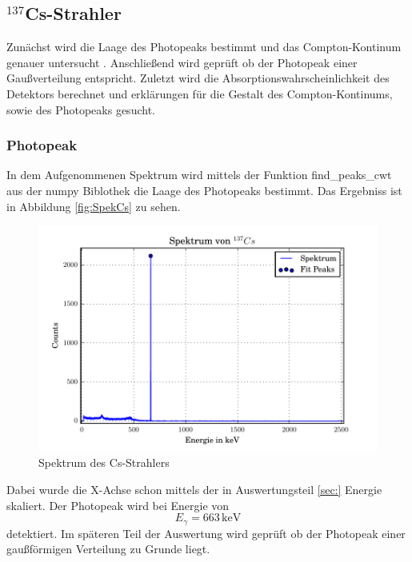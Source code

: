 \subsection{$^{137}$Cs-Strahler}
Zunächst wird die Laage des Photopeaks bestimmt und das Compton-Kontinum genauer untersucht . Anschließend wird geprüft ob der Photopeak einer Gaußverteilung entspricht. Zuletzt wird die Absorptionswahrscheinlichkeit des Detektors berechnet und erklärungen für die Gestalt des Compton-Kontinums, sowie des Photopeaks gesucht.
\subsubsection{Photopeak}
In dem Aufgenommenen Spektrum wird mittels der Funktion find\_peaks\_cwt aus der numpy Biblothek die Laage des Photopeaks bestimmt. Das Ergebniss ist in Abbildung \ref{fig:SpekCs} zu sehen.
\begin{figure}
  \centering
  \includegraphics[width=\textwidth]{./build/SpektCS.pdf}
  \caption{Spektrum des Cs-Strahlers}
  \label{fig:SpekCS}
\end{figure}
Dabei wurde die X-Achse schon mittels der in Auswertungsteil \ref{sec:} Energie skaliert. Der Photopeak wird bei Energie von
\begin{equation}
  E_\gamma = 663 \, \text{keV}
  \label{eqn:CsPhoto}
\end{equation}
detektiert. Im späteren Teil der Auswertung wird geprüft ob der Photopeak einer gaußförmigen Verteilung zu Grunde liegt.

